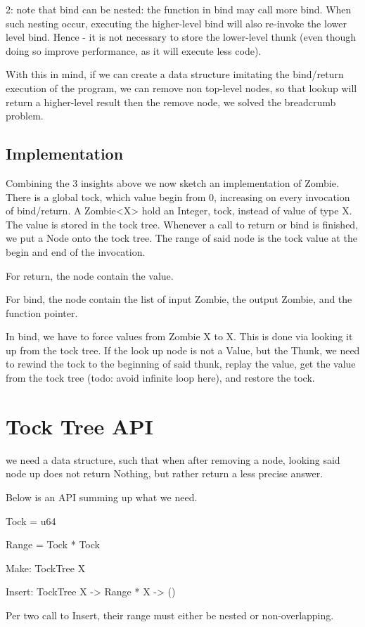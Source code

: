 2: note that bind can be nested: the function in bind may call more bind. When such nesting occur, executing the higher-level bind will also re-invoke the lower level bind. Hence - it is not necessary to store the lower-level thunk (even though doing so improve performance, as it will execute less code).

With this in mind, if we can create a data structure imitating the bind/return execution of the program, we can remove non top-level nodes, so that lookup will return a higher-level result then the remove node, we solved the breadcrumb problem.
\subsection{Implementation}
Combining the 3 insights above we now sketch an implementation of Zombie.
There is a global tock, which value begin from 0, increasing on every invocation of bind/return.
A Zombie<X> hold an Integer, tock, instead of value of type X.
The value is stored in the tock tree.
Whenever a call to return or bind is finished, we put a Node onto the tock tree.
The range of said node is the tock value at the begin and end of the invocation.

For return, the node contain the value.

For bind, the node contain the list of input Zombie, the output Zombie, and the function pointer.

In bind, we have to force values from Zombie X to X. This is done via looking it up from the tock tree. If the look up node is not a Value, but the Thunk, we need to rewind the tock to the beginning of said thunk, replay the value, get the value from the tock tree (todo: avoid infinite loop here), and restore the tock.

\section{Tock Tree API}
we need a data structure, such that when after removing a node, looking said node up does not return Nothing, but rather return a less precise answer.

Below is an API summing up what we need.

Tock = u64

Range = Tock * Tock

Make: TockTree X

Insert: TockTree X -> Range * X -> ()

Per two call to Insert, their range must either be nested or non-overlapping.

